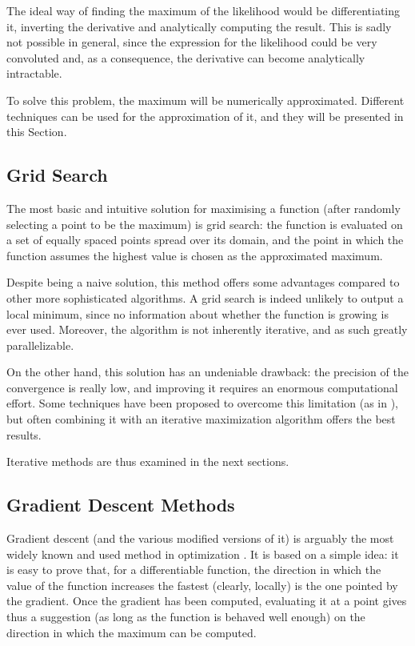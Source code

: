 The ideal way of finding the maximum of the likelihood would be differentiating it,
inverting the derivative and analytically computing the result.
This is sadly not possible in general,
since the expression for the likelihood could be very convoluted and,
as a consequence,
the derivative can become analytically intractable.

To solve this problem,
the maximum will be numerically approximated.
Different techniques can be used for the approximation of it,
and they will be presented in this Section.

\subsection{Grid Search}
\label{sec:grid_search}

The most basic and intuitive solution for maximising a function (after randomly selecting a point to be the maximum) is grid search:
the function is evaluated on a set of equally spaced points spread over its domain,
and the point in which the function assumes the highest value is chosen as the approximated maximum.

Despite being a naive solution,
this method offers some advantages compared to other more sophisticated algorithms.
A grid search is indeed unlikely to output a local minimum,
since no information about whether the function is growing is ever used.
Moreover, the algorithm is not inherently iterative,
and as such greatly parallelizable.

On the other hand,
this solution has an undeniable drawback:
the precision of the convergence is really low,
and improving it requires an enormous computational effort.
Some techniques have been proposed to overcome this limitation
(as in \cite{pathak2024randomizedgridsearchhyperparametertuning,postuvan2022adagridadaptivegridsearch}),
but often combining it with an iterative maximization algorithm offers the best results.

Iterative methods are thus examined in the next sections.

\subsection{Gradient Descent Methods}
\label{sec:grad_desc}

Gradient descent (and the various modified versions of it) is arguably the most widely known and used method in optimization \parencite{ruder2017overviewgradientdescentoptimization}.
It is based on a simple idea:
it is easy to prove that, for a differentiable function,
the direction in which the value of the function increases the fastest (clearly, locally)
is the one pointed by the gradient.
Once the gradient has been computed, evaluating it at a point gives thus a suggestion (as long as the function is behaved well enough) on the direction in which the maximum can be computed.


